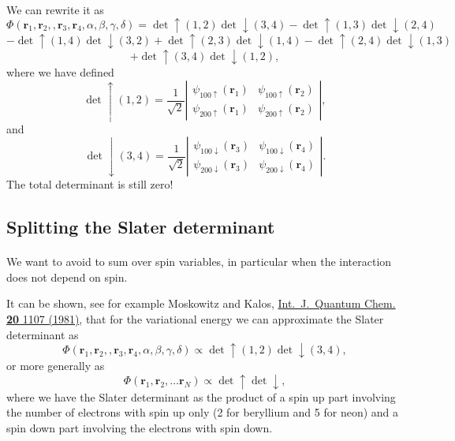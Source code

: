 \documentclass[%
twoside,                 %
final,                   %
10pt]{article}
\begin{document}
\paragraph{}
We can rewrite it as 
\[
   \Phi(\mathbf{r}_1,\mathbf{r}_2,,\mathbf{r}_3,\mathbf{r}_4, \alpha,\beta,\gamma,\delta)=\det\uparrow(1,2)\det\downarrow(3,4)-\det\uparrow(1,3)\det\downarrow(2,4)
\]
\[
-\det\uparrow(1,4)\det\downarrow(3,2)+\det\uparrow(2,3)\det\downarrow(1,4)-\det\uparrow(2,4)\det\downarrow(1,3)
\]
\[
+\det\uparrow(3,4)\det\downarrow(1,2),
\]
where we have defined
\[
\det\uparrow(1,2)=\frac{1}{\sqrt{2}}\left| \begin{array}{cc} \psi_{100\uparrow}(\mathbf{r}_1)& \psi_{100\uparrow}(\mathbf{r}_2)\\
\psi_{200\uparrow}(\mathbf{r}_1)& \psi_{200\uparrow}(\mathbf{r}_2) \end{array} \right|,
\]
and 
\[
\det\downarrow(3,4)=\frac{1}{\sqrt{2}}\left| \begin{array}{cc} \psi_{100\downarrow}(\mathbf{r}_3)& \psi_{100\downarrow}(\mathbf{r}_4)\\
\psi_{200\downarrow}(\mathbf{r}_3)& \psi_{200\downarrow}(\mathbf{r}_4) \end{array} \right|.
\]
The total determinant is still zero!



\subsection*{Splitting the Slater determinant}

\paragraph{}

We want to avoid to sum over spin variables, in particular when the interaction does not depend on spin.

It can be shown, see for example Moskowitz and Kalos, \href{{http://onlinelibrary.wiley.com/doi/10.1002/qua.560200508/abstract}}{Int.~J.~Quantum Chem. \textbf{20} 1107 (1981)}, that for the variational energy
we can approximate the Slater determinant as  
\[
   \Phi(\mathbf{r}_1,\mathbf{r}_2,,\mathbf{r}_3,\mathbf{r}_4, \alpha,\beta,\gamma,\delta) \propto \det\uparrow(1,2)\det\downarrow(3,4),
\]
or more generally as 
\[
   \Phi(\mathbf{r}_1,\mathbf{r}_2,\dots \mathbf{r}_N) \propto \det\uparrow \det\downarrow,
\]
where we have the Slater determinant as the product of a spin up part involving the number of electrons with spin up only (2 for beryllium and 5 for neon) and a spin down part involving the electrons with spin down.
\end{document}
